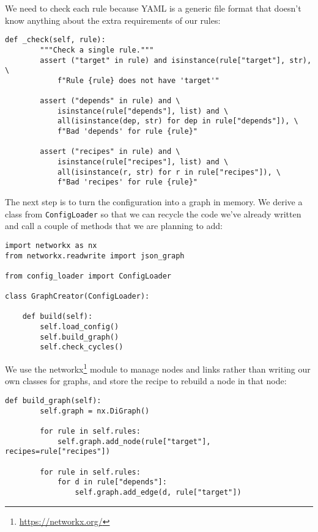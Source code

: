 \documentclass{scrbook}
\newcommand{\hreffoot}[2]{{#1}\footnote{\href{#2}{#2}}}
\begin{document}
We need to check each rule because YAML is a generic file format
that doesn't know anything about the extra requirements of our rules:


\begin{lstlisting}[frame=single,frameround=tttt]
    def _check(self, rule):
        """Check a single rule."""
        assert ("target" in rule) and isinstance(rule["target"], str), \
            f"Rule {rule} does not have 'target'"

        assert ("depends" in rule) and \
            isinstance(rule["depends"], list) and \
            all(isinstance(dep, str) for dep in rule["depends"]), \
            f"Bad 'depends' for rule {rule}"

        assert ("recipes" in rule) and \
            isinstance(rule["recipes"], list) and \
            all(isinstance(r, str) for r in rule["recipes"]), \
            f"Bad 'recipes' for rule {rule}"
\end{lstlisting}



The next step is to turn the configuration into a graph in memory.
We derive a class from \texttt{ConfigLoader} so that we can recycle the code we've already written
and call a couple of methods that we are planning to add:


\begin{lstlisting}[frame=single,frameround=tttt]
import networkx as nx
from networkx.readwrite import json_graph

from config_loader import ConfigLoader

class GraphCreator(ConfigLoader):

    def build(self):
        self.load_config()
        self.build_graph()
        self.check_cycles()
\end{lstlisting}



We use the \hreffoot{networkx}{https://networkx.org/} module to manage nodes and links
rather than writing our own classes for graphs,
and store the recipe to rebuild a node in that node:


\begin{lstlisting}[frame=single,frameround=tttt]
    def build_graph(self):
        self.graph = nx.DiGraph()

        for rule in self.rules:
            self.graph.add_node(rule["target"], recipes=rule["recipes"])

        for rule in self.rules:
            for d in rule["depends"]:
                self.graph.add_edge(d, rule["target"])
\end{lstlisting}
\end{document}
